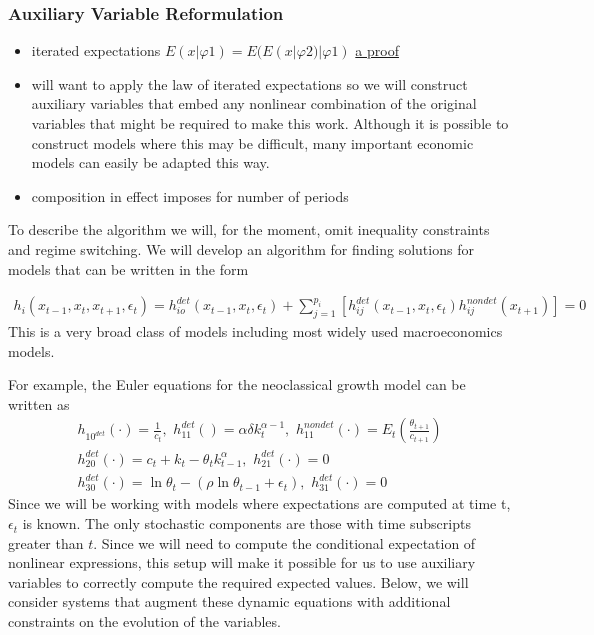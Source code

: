 \documentclass[12pt]{article}
\begin{document}
\subsubsection{Auxiliary Variable Reformulation}
\label{sec:aux}

\begin{itemize}
\item iterated expectations $E (x | φ1) = E (E (x | φ2) | φ1) $
  \href{https://stats.stackexchange.com/questions/95947/a-generalization-of-the-law-of-iterated-expectations}{a proof}
\item will want to apply the law of iterated expectations so we will construct auxiliary variables that embed any nonlinear combination  of the original
  variables that might be required to make this work.  Although it is possible to construct models where this may be difficult, many important economic models
  can easily be adapted this way.

\end{itemize}


\begin{itemize}
\item composition in effect imposes for number of periods
\end{itemize}



To describe the algorithm we will, for the moment, omit inequality constraints
and regime switching.
We will develop an algorithm for finding solutions for models that can be written in  the form


\begin{gather}
  h_i(x_{t-1},x_{t},x_{t+1},\epsilon_t)=h^{det}_{io}(x_{t-1},x_{t},\epsilon_t)+\sum_{j=1}^{p_i} [h^{det}_{ij}(x_{t-1},x_{t},\epsilon_t)h^{nondet}_{ij}(x_{t+1})]=0
\end{gather}
This is a very broad class of models including most widely used
macroeconomics models.

For example, the Euler equations for the  neoclassical growth  model 
\label{sec:simple-rbc-model-ext} can be written as
\begin{gather}
h_{10^{det}}(\cdot)=\frac{1}{c_t},\,\,
h_{11}^{det}()=\alpha \delta k_{t}^{\alpha-1} ,\,\,
h_{11}^{nondet}(\cdot)=E_t \left (\frac{\theta_{t+1}}{c_{t+1}} \right )\\
h_{20}^{det}(\cdot)=c_t + k_t-\theta_tk_{t-1}^\alpha,\,\,
h_{21}^{det}(\cdot)=0\\
h_{30}^{det}(\cdot)=\ln \theta_t -(\rho \ln \theta_{t-1} + \epsilon_t),\,\,
h_{31}^{det}(\cdot)=0
\end{gather}
Since we will be working with models where expectations are computed at time t, $\epsilon_t$ is known.  The only stochastic components are those with time subscripts greater than $t$. Since we will need to compute 
the conditional expectation of nonlinear expressions,  
this setup will make it possible for us to use auxiliary
variables to correctly compute the required expected values.
Below, we will consider 
systems that augment these dynamic equations with additional constraints 
on the evolution of the variables.
\end{document}
